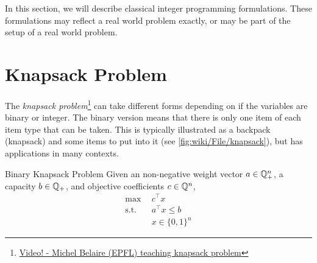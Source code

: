 In this section, we will describe classical integer programming formulations.     These formulations may reflect  a real world problem exactly, or may be part of the setup of a real world problem.   

\section{Knapsack Problem}
The \emph{knapsack problem}\footnote{\href{https://www.youtube.com/watch?v=GteOoMGUOdY}{Video! - Michel Belaire (EPFL) teaching knapsack problem}} can take different forms depending on if the variables are binary or integer.  The binary version means that there is only one item of each item type that can be taken.  This is typically illustrated as a backpack (knapsack) and some items to put into it (see  \autoref{fig:wiki/File/knapsack}), but has applications in many contexts.  


\begin{general}{Binary Knapsack Problem}{\npcomplete}
Given an non-negative weight vector $a \in {\mathbb{Q}}^n_+$, a capacity $b \in {\mathbb{Q}}_+$, and objective coefficients $c \in {\mathbb{Q}}^n$, 
\begin{equation}
\begin{split}
\max \ \ & c^\top x\\
\text{s.t.}\ \ & a^\top x \leq b\\
& x \in \{0,1\}^n
\end{split}
\end{equation}
\end{general}
 


 

